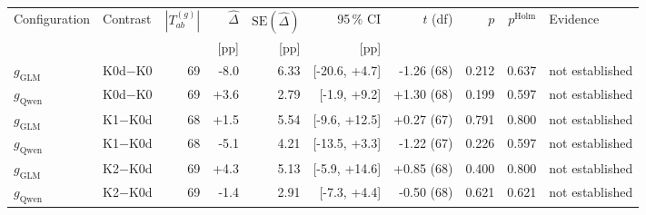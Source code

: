 \begin{tabular}{@{}llrrrrrrrl@{}}
  \toprule
  Configuration & Contrast & $|T^{(g)}_{ab}|$ & $\widehat\Delta$ & $\mathrm{SE}(\widehat\Delta)$ & 95\,\% CI & $t$ (df) & $p$ & $p^{\mathrm{Holm}}$ & Evidence \\
   & & & [pp] & [pp] & [pp] & & & & \\
  \midrule
  $g_{\mathrm{GLM}}$ & K0d$-$K0 & 69 & -8.0 & 6.33 & [-20.6, +4.7] & -1.26 (68) & 0.212 & 0.637 & not established \\
  \rowcolor{black!6} $g_{\mathrm{Qwen}}$ & K0d$-$K0 & 69 & +3.6 & 2.79 & [-1.9, +9.2] & +1.30 (68) & 0.199 & 0.597 & not established \\
  $g_{\mathrm{GLM}}$ & K1$-$K0d & 68 & +1.5 & 5.54 & [-9.6, +12.5] & +0.27 (67) & 0.791 & 0.800 & not established \\
  \rowcolor{black!6} $g_{\mathrm{Qwen}}$ & K1$-$K0d & 68 & -5.1 & 4.21 & [-13.5, +3.3] & -1.22 (67) & 0.226 & 0.597 & not established \\
  $g_{\mathrm{GLM}}$ & K2$-$K0d & 69 & +4.3 & 5.13 & [-5.9, +14.6] & +0.85 (68) & 0.400 & 0.800 & not established \\
  \rowcolor{black!6} $g_{\mathrm{Qwen}}$ & K2$-$K0d & 69 & -1.4 & 2.91 & [-7.3, +4.4] & -0.50 (68) & 0.621 & 0.621 & not established \\
  \bottomrule
\end{tabular}
